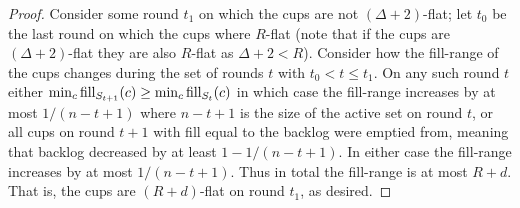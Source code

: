 \begin{proof}
  Consider some round $t_1$ on which the cups are not $(\Delta +
  2)$-flat; let $t_0$ be the last round on which the cups where
  $R$-flat (note that if the cups are $(\Delta+2)$-flat they are
  also $R$-flat as $\Delta + 2 < R$). Consider how the fill-range
  of the cups changes during the set of rounds
  $t$ with $t_0 < t \le t_1$. On any such round $t$ either $\min_c
  \operatorname{\textnormal{fill}}_{S_{t+1}}(c) \ge \min_c \operatorname{\textnormal{fill}}_{S_{t}}(c)$ in which case the
  fill-range increases by at most $1/(n-t+1)$ where $n-t+1$ is the
  size of the active set on round $t$, or all cups on round $t+1$
  with fill equal to the backlog were emptied from, meaning that
  backlog decreased by at least $1-1/(n-t+1)$. In either case the
  fill-range increases by at most $1/(n-t+1)$. Thus in total the
  fill-range is at most $R + d$. That is, the cups are
  $(R+d)$-flat on round $t_1$, as desired.

\end{proof}

